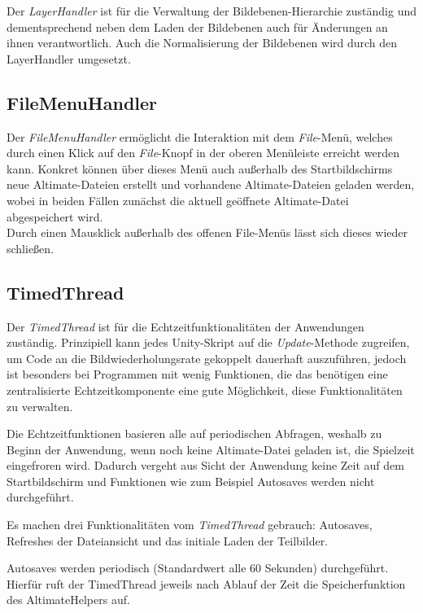 \documentclass[oneside]{ausarbeitung}
\begin{document}
Der \textit{LayerHandler} ist für die Verwaltung der Bildebenen-Hierarchie zuständig und dementsprechend neben dem Laden der Bildebenen auch für Änderungen an ihnen verantwortlich. Auch die Normalisierung der Bildebenen wird durch den LayerHandler umgesetzt.



\subsection{FileMenuHandler}

Der \textit{FileMenuHandler} ermöglicht die Interaktion mit dem \textit{File}-Menü, welches durch einen Klick auf den \textit{File}-Knopf in der oberen Menüleiste erreicht werden kann. Konkret können über dieses Menü auch außerhalb des Startbildschirms neue Altimate-Dateien erstellt und vorhandene Altimate-Dateien geladen werden, wobei in beiden Fällen zunächst die aktuell geöffnete Altimate-Datei abgespeichert wird.\\
Durch einen Mausklick außerhalb des offenen File-Menüs lässt sich dieses wieder schließen.



\subsection{TimedThread}

Der \textit{TimedThread} ist für die Echtzeitfunktionalitäten der Anwendungen zuständig. Prinzipiell kann jedes Unity-Skript auf die \textit{Update}-Methode zugreifen, um Code an die Bildwiederholungsrate gekoppelt dauerhaft auszuführen, jedoch ist besonders bei Programmen mit wenig Funktionen, die das benötigen eine zentralisierte Echtzeitkomponente eine gute Möglichkeit, diese Funktionalitäten zu verwalten.

Die Echtzeitfunktionen basieren alle auf periodischen Abfragen, weshalb zu Beginn der Anwendung, wenn noch keine Altimate-Datei geladen ist, die Spielzeit eingefroren wird. Dadurch vergeht aus Sicht der Anwendung keine Zeit auf dem Startbildschirm und Funktionen wie zum Beispiel Autosaves werden nicht durchgeführt.

Es machen drei Funktionalitäten vom \textit{TimedThread} gebrauch: Autosaves, Refreshes der Dateiansicht und das initiale Laden der Teilbilder.

Autosaves werden periodisch (Standardwert alle 60 Sekunden) durchgeführt. Hierfür ruft der TimedThread jeweils nach Ablauf der Zeit die Speicherfunktion des AltimateHelpers auf.
\end{document}

